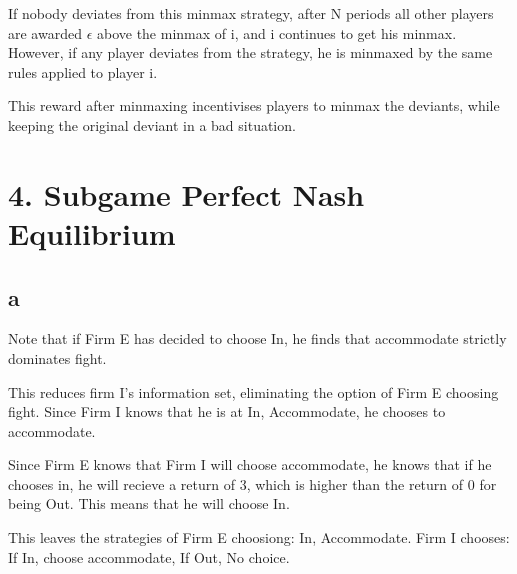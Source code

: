 \documentclass[10pt]{paper}
\begin{document}
If nobody deviates from this minmax strategy, after N periods all
other players are awarded $\epsilon$ above the minmax of i, and i continues
to get his minmax. However, if any player deviates from the strategy,
he is minmaxed by the same rules applied to player i.

This reward after minmaxing incentivises players to minmax the
deviants, while keeping the original deviant in a bad situation. 

\section*{4. Subgame Perfect Nash Equilibrium}

\subsection*{a}

Note that if Firm E has decided to choose In, he finds that
accommodate strictly dominates fight.

This reduces firm I's information set, eliminating the option of Firm
E choosing fight. Since Firm I knows that he is at In, Accommodate, he
chooses to accommodate.

Since Firm E knows that Firm I will choose accommodate, he knows that
if he chooses in, he will recieve a return of 3, which is higher than
the return of 0 for being Out. This means that he will choose In. 

This leaves the strategies of Firm E choosiong: In, Accommodate.
Firm I chooses: If In, choose accommodate, If Out, No choice. 
\end{document}

